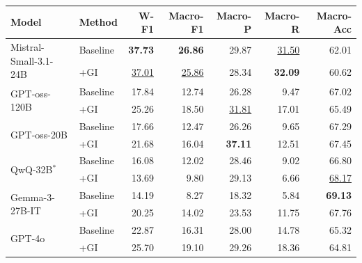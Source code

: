\begin{table}[t]
\centering
\small
\setlength{\tabcolsep}{6pt}
\renewcommand{\arraystretch}{1.2}
\begin{tabular}{l l rrrrr}
\toprule
\textbf{Model} & \textbf{Method} & \textbf{W-F1} & \textbf{Macro-F1} & \textbf{Macro-P} & \textbf{Macro-R} & \textbf{Macro-Acc} \\
\midrule
\multirow{2}{*}{Mistral-Small-3.1-24B}
  & Baseline & \textbf{37.73}     & \textbf{26.86}     & 29.87              & \underline{31.50}  & 62.01              \\
  & +GI      & \underline{37.01}  & \underline{25.86}  & 28.34              & \textbf{32.09}     & 60.62              \\[3pt]
\multirow{2}{*}{GPT-oss-120B}
  & Baseline & 17.84              & 12.74              & 26.28              &  9.47              & 67.02              \\
  & +GI      & 25.26              & 18.50              & \underline{31.81}  & 17.01              & 65.49              \\[3pt]
\multirow{2}{*}{GPT-oss-20B}
  & Baseline & 17.66              & 12.47              & 26.26              &  9.65              & 67.29              \\
  & +GI      & 21.68              & 16.04              & \textbf{37.11}     & 12.51              & 67.45              \\[3pt]
\multirow{2}{*}{QwQ-32B$^{*}$}
  & Baseline & 16.08              & 12.02              & 28.46              &  9.02              & 66.80              \\
  & +GI      & 13.69              &  9.80              & 29.13              &  6.66              & \underline{68.17}  \\[3pt]
\multirow{2}{*}{Gemma-3-27B-IT}
  & Baseline & 14.19              &  8.27              & 18.32              &  5.84              & \textbf{69.13}     \\
  & +GI      & 20.25              & 14.02              & 23.53              & 11.75              & 67.76              \\
\midrule
\multirow{2}{*}{GPT-4o}
  & Baseline & 22.87              & 16.31              & 28.00              & 14.78              & 65.32              \\
  & +GI      & 25.70              & 19.10              & 29.26              & 18.36              & 64.81              \\
\bottomrule
\end{tabular}

\end{table}

